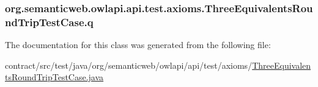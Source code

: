 \hypertarget{classorg_1_1semanticweb_1_1owlapi_1_1api_1_1test_1_1axioms_1_1_three_equivalents_round_trip_test_case_ac3e3092e011387a47674019748a58006}{
\subsubsection[{q}]{ org.\-semanticweb.\-owlapi.\-api.\-test.\-axioms.\-Three\-Equivalents\-Round\-Trip\-Test\-Case.\-q\hspace{0.3cm}{\ttfamily [private]}}}\label{classorg_1_1semanticweb_1_1owlapi_1_1api_1_1test_1_1axioms_1_1_three_equivalents_round_trip_test_case_ac3e3092e011387a47674019748a58006}


The documentation for this class was generated from the following file\-:\begin{DoxyCompactItemize}
\item 
contract/src/test/java/org/semanticweb/owlapi/api/test/axioms/\hyperlink{_three_equivalents_round_trip_test_case_8java}{Three\-Equivalents\-Round\-Trip\-Test\-Case.\-java}\end{DoxyCompactItemize}
